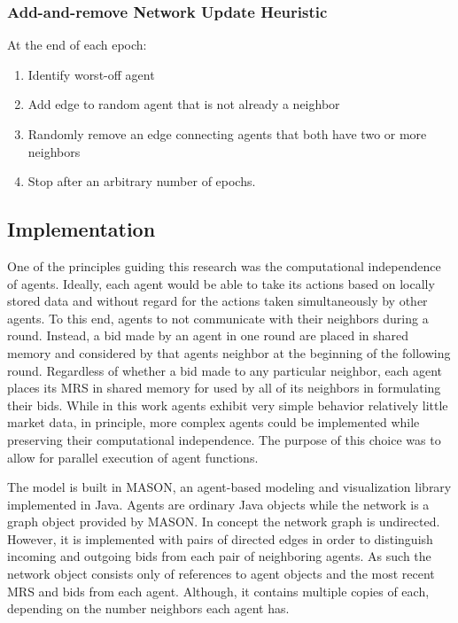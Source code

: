 \documentclass[smallextended]{svjour3}
\begin{document}
\subsubsection{Add-and-remove Network Update Heuristic}
  At the end of each epoch:
  \begin{enumerate}
  \item Identify worst-off agent
  \item Add edge to random agent that is not already a neighbor
  \item Randomly remove an edge connecting agents that both have two or more neighbors
  \item Stop after an arbitrary number of epochs.
  \end{enumerate}

\subsection{Implementation}
One of the principles guiding this research was the computational independence
of agents. Ideally, each agent would be able to take its actions based on
locally stored data and without regard for the actions taken simultaneously by
other agents.
To this end, agents to not communicate with their neighbors during a round.
Instead, a bid made by an agent in one round are placed in shared memory and
considered by that agents neighbor at the beginning of the following round.
Regardless of whether a bid made to any particular neighbor, each agent places
its MRS in shared memory for used by all of its neighbors in formulating their
bids.
While in this work agents exhibit very simple behavior relatively little market
data, in principle, more complex agents could be implemented while preserving
their computational independence.
The purpose of this choice was to allow for parallel execution of agent
functions.

The model is built in MASON, an agent-based modeling and visualization
library implemented in Java. Agents are ordinary Java objects while the network
is a graph object provided by MASON. In concept the network graph is undirected.
However, it is implemented with pairs of directed edges in order to distinguish incoming
and outgoing bids from each pair of neighboring agents. As such the network
object consists only of references to agent objects and the most recent MRS and
bids from each agent. Although, it contains multiple copies of each, depending
on the number neighbors each agent has.
\end{document}
